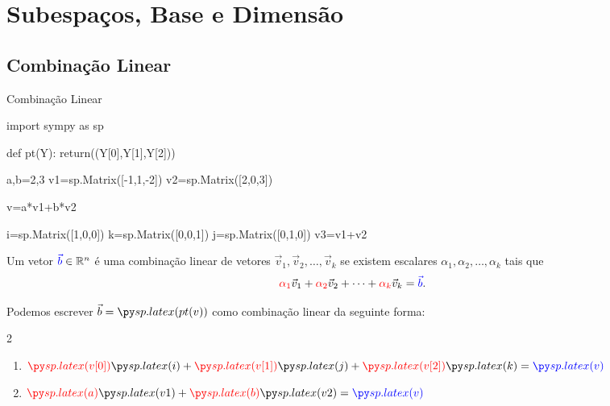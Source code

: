 \section{Subespaços, Base e Dimensão}

\subsection*{Combinação Linear}
\begin{frame}[label=lild,fragile]{Combinação Linear}
\begin{pycode} 
import sympy as sp

def pt(Y):
 return((Y[0],Y[1],Y[2]))


a,b=2,3
v1=sp.Matrix([-1,1,-2])
v2=sp.Matrix([2,0,3])

v=a*v1+b*v2

i=sp.Matrix([1,0,0])
k=sp.Matrix([0,0,1])
j=sp.Matrix([0,1,0])
v3=v1+v2

\end{pycode} 
\begin{defin}
Um vetor ${\color{blue}\vec{b}}\in \mathbb{R}^n$ é uma {\color{blue} combinação linear} de vetores $\vec{v}_1, \vec{v}_2, \ldots, \vec{v}_k$ se existem escalares {\color{red}$\alpha_1,\alpha_2,\ldots, \alpha_k$} tais que
\[{\color{red}\alpha_1}\vec{v}_1+{\color{red}\alpha_2}\vec{v}_2+\cdots +{\color{red}\alpha_k}\vec{v}_k={\color{blue}\vec{b}}.\]
\end{defin}

\begin{exe}
Podemos escrever  {\color{blue}\(\vec{b}=\pyl{pt(v)}\)} como combinação linear da seguinte forma:
\begin{multicols}{2}
\begin{enumerate}[a]
\item \({\color{red}\pyl{v[0]}}\pyl{i}+{\color{red}\pyl{v[1]}}\pyl{j} +{\color{red}\pyl{v[2]}}\pyl{k}={\color{blue}\pyl{v}}\)
\item \({\color{red}\pyl{a}}\pyl{v1}+{\color{red}\pyl{b}}\pyl{v2}={\color{blue}\pyl{v}}\)
\end{enumerate}
\end{multicols}
\smallskip
\end{exe}

\end{frame}

